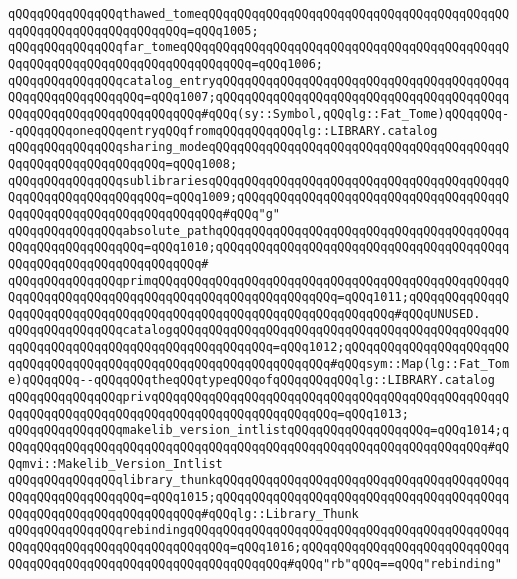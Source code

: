 \verb|qQQqqQQqqQQqqQQqthawed_tomeqQQqqQQqqQQqqQQqqQQqqQQqqQQqqQQqqQQqqQQqqQQqqQQqqQQqqQQqqQQqqQQqqQQq=qQQq1005;|\newline
\verb|qQQqqQQqqQQqqQQqfar_tomeqQQqqQQqqQQqqQQqqQQqqQQqqQQqqQQqqQQqqQQqqQQqqQQqqQQqqQQqqQQqqQQqqQQqqQQqqQQqqQQq=qQQq1006;|\newline
\verb|qQQqqQQqqQQqqQQqcatalog_entryqQQqqQQqqQQqqQQqqQQqqQQqqQQqqQQqqQQqqQQqqQQqqQQqqQQqqQQqqQQq=qQQq1007;qQQqqQQqqQQqqQQqqQQqqQQqqQQqqQQqqQQqqQQqqQQqqQQqqQQqqQQqqQQqqQQqqQQq#qQQq(sy::Symbol,qQQqlg::Fat_Tome)qQQqqQQq--qQQqqQQqoneqQQqentryqQQqfromqQQqqQQqqQQqlg::LIBRARY.catalog|\newline
\verb|qQQqqQQqqQQqqQQqsharing_modeqQQqqQQqqQQqqQQqqQQqqQQqqQQqqQQqqQQqqQQqqQQqqQQqqQQqqQQqqQQqqQQq=qQQq1008;|\newline
\verb|qQQqqQQqqQQqqQQqsublibrariesqQQqqQQqqQQqqQQqqQQqqQQqqQQqqQQqqQQqqQQqqQQqqQQqqQQqqQQqqQQqqQQq=qQQq1009;qQQqqQQqqQQqqQQqqQQqqQQqqQQqqQQqqQQqqQQqqQQqqQQqqQQqqQQqqQQqqQQqqQQq#qQQq"g"|\newline
\verb|qQQqqQQqqQQqqQQqabsolute_pathqQQqqQQqqQQqqQQqqQQqqQQqqQQqqQQqqQQqqQQqqQQqqQQqqQQqqQQqqQQq=qQQq1010;qQQqqQQqqQQqqQQqqQQqqQQqqQQqqQQqqQQqqQQqqQQqqQQqqQQqqQQqqQQqqQQqqQQq#|\newline
\verb|qQQqqQQqqQQqqQQqprimqQQqqQQqqQQqqQQqqQQqqQQqqQQqqQQqqQQqqQQqqQQqqQQqqQQqqQQqqQQqqQQqqQQqqQQqqQQqqQQqqQQqqQQqqQQqqQQq=qQQq1011;qQQqqQQqqQQqqQQqqQQqqQQqqQQqqQQqqQQqqQQqqQQqqQQqqQQqqQQqqQQqqQQqqQQq#qQQqUNUSED.|\newline
\verb|qQQqqQQqqQQqqQQqcatalogqQQqqQQqqQQqqQQqqQQqqQQqqQQqqQQqqQQqqQQqqQQqqQQqqQQqqQQqqQQqqQQqqQQqqQQqqQQqqQQqqQQq=qQQq1012;qQQqqQQqqQQqqQQqqQQqqQQqqQQqqQQqqQQqqQQqqQQqqQQqqQQqqQQqqQQqqQQqqQQq#qQQqsym::Map(lg::Fat_Tome)qQQqqQQq--qQQqqQQqtheqQQqtypeqQQqofqQQqqQQqqQQqlg::LIBRARY.catalog|\newline
\verb|qQQqqQQqqQQqqQQqprivqQQqqQQqqQQqqQQqqQQqqQQqqQQqqQQqqQQqqQQqqQQqqQQqqQQqqQQqqQQqqQQqqQQqqQQqqQQqqQQqqQQqqQQqqQQqqQQq=qQQq1013;|\newline
\verb|qQQqqQQqqQQqqQQqmakelib_version_intlistqQQqqQQqqQQqqQQqqQQq=qQQq1014;qQQqqQQqqQQqqQQqqQQqqQQqqQQqqQQqqQQqqQQqqQQqqQQqqQQqqQQqqQQqqQQqqQQq#qQQqmvi::Makelib_Version_Intlist|\newline
\verb|qQQqqQQqqQQqqQQqlibrary_thunkqQQqqQQqqQQqqQQqqQQqqQQqqQQqqQQqqQQqqQQqqQQqqQQqqQQqqQQqqQQq=qQQq1015;qQQqqQQqqQQqqQQqqQQqqQQqqQQqqQQqqQQqqQQqqQQqqQQqqQQqqQQqqQQqqQQqqQQq#qQQqlg::Library_Thunk|\newline
\verb|qQQqqQQqqQQqqQQqrebindingqQQqqQQqqQQqqQQqqQQqqQQqqQQqqQQqqQQqqQQqqQQqqQQqqQQqqQQqqQQqqQQqqQQqqQQqqQQq=qQQq1016;qQQqqQQqqQQqqQQqqQQqqQQqqQQqqQQqqQQqqQQqqQQqqQQqqQQqqQQqqQQqqQQqqQQq#qQQq"rb"qQQq==qQQq"rebinding"|\newline

